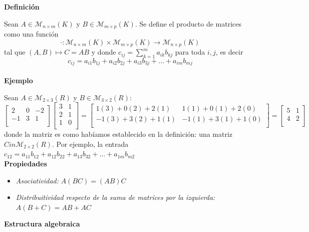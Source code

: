 \noindent\textbf{Definición}

Sean $A \in \mathcal{M}_{n\times {m}}(K)$ y  $B \in \mathcal{M}_{m\times {p}}(K)$. Se define el producto de matrices como una función
$$
\cdot : \mathcal{M}_{n\times {m}}(K) \times \mathcal{M}_{m\times {p}}(K) \longrightarrow \mathcal{M}_{n\times {p}}(K)
$$ 
tal que $(A,B) \mapsto C = AB$ y donde $c_{ij}= \sum\limits_{k=1}^m a_{ik}b_{kj}$ para toda $i, j$, es decir
$$
c_{ij} = a_{i1}b_{1j} + a_{i2}b_{2j} + a_{i3}b_{3j} + \ldots + a_{im}b_{mj}
$$ \\

\noindent\textbf{Ejemplo}

Sean $A \in \mathcal{M}_{2\times {3}}(R)$ y $B \in \mathcal{M}_{3\times {2}}(R)$:
$$
\begin{bmatrix}
2 & 0 & -2 \\
-1 & 3 & 1 \\
\end{bmatrix}
\begin{bmatrix}
3 & 1 \\
2 & 1 \\
1 & 0 \\
\end{bmatrix}
=
\begin{bmatrix}
1(3) + 0(2) + 2(1) & 1(1) + 0(1) + 2(0) \\
-1(3) + 3(2) + 1(1) & -1(1) + 3(1) + 1(0) \\
\end{bmatrix}
=
\begin{bmatrix}
5 & 1 \\
4 & 2 \\
\end{bmatrix}
$$
donde la matriz es como habíamos establecido en la definición: una matriz $C in \mathcal{M}_{2\times {2}}(R)$. Por ejemplo, la entrada $c_{12} = a_{11}b_{12} + a_{12}b_{22} + a_{13}b_{32} + \ldots + a_{1m}b_{m2}$ \\

\noindent\textbf{Propiedades}

\begin{itemize}
\item \textit{Asociatividad:} $A(BC) = (AB)C$
\item \textit{Distribuitividad respecto de la suma de matrices por la izquierda:} $A(B+C) = AB + AC$
\end{itemize}


\noindent\textbf{Estructura algebraica}

